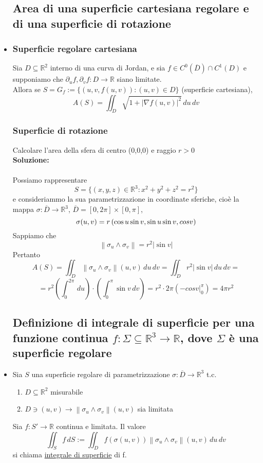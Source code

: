 \documentclass{report}
\newcommand{\ace}{\`e }
\newcommand{\Ins}[1]{\mathbb{#1}}
\newcommand{\R}{\Ins{R}}
\newcommand{\abs}[1]{\left\lvert #1 \right\rvert}
\newcommand{\norma}[1]{\left\lVert#1\right\rVert}
\newcommand{\p}{\partial}
\begin{document}
\begin{itemize}
  \subsection{Area di una superficie cartesiana regolare e di una superficie di rotazione}
  \item \subsubsection{Superficie regolare cartesiana}
          Sia $D\subseteq\R^2$ interno di una curva di Jordan, e sia 
          $f\in C^0(\overline{D})\cap C^1(D)$ e supponiamo che 
          $\p_u f, \p_v f : D \to \R$ siano limitate. \\
          Allora se $S = G_f := \{(u,v,f(u,v)):(u,v)\in D\}$ (superficie cartesiana), 
          $$A(S) = \iint_{D} \sqrt{1+\abs{\nabla f(u,v)}^2} \,du \,dv$$
        \subsubsection{Superficie di rotazione}
        Calcolare l'area della sfera di centro (0,0,0) e raggio $r>0$ \\
        \textbf{Soluzione:} \\\\
        Possiamo rappresentare 
        $$S = \{(x,y,z)\in\R^3:x^2+y^2+z^2 = r^2\}$$
        e consideriammo la sua parametrizzazione in coordinate sferiche, cio\ace 
        la mappa $\sigma:\overline{D}\to\R^3$, $\overline{D}=[0,2\pi]\times[0,\pi]$, 
        $$\sigma(u,v) = r\left(\cos{u}\sin{v}, \sin{u}\sin{v}, \\cos{v}\right)$$
        Sappiamo che $$\norma{\sigma_u\wedge\sigma_v} = r^2\abs{\sin{v}}$$
        Pertanto 
        $$A(S) = \iint_{D} \norma{\sigma_u\wedge\sigma_v} (u,v) \,du\,dv = \iint_{D} r^2\abs{\sin{v}} \,du\,dv = $$
        $$= r^2\left(\int_{0}^{2\pi} \,du\right)\cdot\left(\int_{0}^{\pi}\sin{v} \,dv\right) = 
            r^2\cdot 2\pi \left(\left.-cos{v}\right|_{0}^{\pi}\right) = 4\pi r^2$$

  \subsection{Definizione di integrale di superficie per una funzione continua $f:\Sigma\subseteq\R^3\to\R$, dove $\Sigma$ è una superficie regolare}
  \item Sia $S$ una superficie regolare di parametrizzazione $\sigma:\overline{D}\to\R^3$ t.c. 
        \begin{enumerate}
          \item $D\subseteq \R^2$ misurabile
          \item $D\ni (u,v) \to \norma{\sigma_u\wedge\sigma_v}(u,v)$ sia limitata
        \end{enumerate}
        Sia $f:S' \to \R$ continua e limitata. Il valore
        $$\iint_{S} f \,dS := \iint_{D} f(\sigma(u,v))\norma{\sigma_u\wedge\sigma_v}(u,v) \,du\,dv$$
        si chiama \underline{integrale di superficie} di f.
  \end{itemize}
\end{document}
